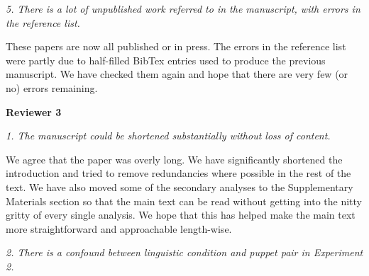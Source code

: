\documentclass[11pt,a4paper]{letter} %
\begin{document}
\begin{letter}{}
\smallskip

\noindent \textit{5. There is a lot of unpublished work referred to in the manuscript, with errors in the reference list.}

\noindent These papers are now all published or in press. The errors in the reference list were partly due to half-filled BibTex entries used to produce the previous manuscript. We have checked them again and hope that there are very few (or no) errors remaining.

\bigskip

\noindent \textbf{Reviewer 3}

\noindent \textit{1. The manuscript could be shortened substantially without loss of content.}

\noindent We agree that the paper was overly long. We have significantly shortened the introduction and tried to remove redundancies where possible in the rest of the text. We have also moved some of the secondary analyses to the Supplementary Materials section so that the main text can be read without getting into the nitty gritty of every single analysis. We hope that this has helped make the main text more straightforward and approachable length-wise.

\smallskip

\noindent \textit{2. There is a confound between linguistic condition and puppet pair in Experiment 2.}


\end{letter}
\end{document}
